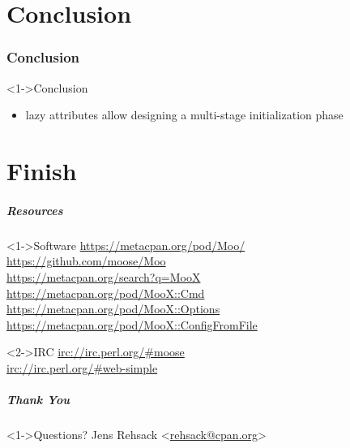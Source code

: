\documentclass[ngerman,xcolor={table,dvipsnames},scriptsizeer,compress,hyperref={bookmarks,colorlinks}]{beamer}
\begin{document}
\part{Conclusion}

\section{Conclusion}

\begin{frame}[t,fragile]

\begin{block}<1->{Conclusion}
\begin{itemize}
\item lazy attributes allow designing a multi-stage initialization phase
\end{itemize}
\end{block}

\end{frame}






\part{Finish}

\begin{frame}[t,fragile]
\frametitle{Resources}
\begin{block}<1->{Software}
\url{https://metacpan.org/pod/Moo/} \\
\url{https://github.com/moose/Moo} \\
\url{https://metacpan.org/search?q=MooX} \\
\url{https://metacpan.org/pod/MooX::Cmd} \\
\url{https://metacpan.org/pod/MooX::Options} \\
\url{https://metacpan.org/pod/MooX::ConfigFromFile}
\end{block}

\begin{block}<2->{IRC}
\url{irc://irc.perl.org/#moose} \\
\url{irc://irc.perl.org/#web-simple}
\end{block}
\end{frame}

\begin{frame}[fragile]
\frametitle{Thank You}
\begin{block}<1->{Questions?}
Jens Rehsack \textless{}\href{mailto:rehsack@cpan.org}{rehsack@cpan.org}\textgreater{}
\end{block}
\end{frame}
\end{document}
